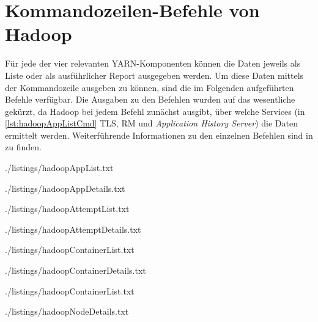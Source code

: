\chapter{Kommandozeilen-Befehle von Hadoop}\label{app:hadoopCmds}

Für jede der vier relevanten YARN-Komponenten können die Daten jeweils als Liste oder als ausführlicher Report ausgegeben werden. Um diese Daten mittels der Kommandozeile ausgeben zu können, sind die im Folgenden aufgeführten Befehle verfügbar. Die Ausgaben zu den Befehlen wurden auf das wesentliche gekürzt, \uA da Hadoop bei jedem Befehl zunächst ausgibt, über welche Services (in \autoref{lst:hadoopAppListCmd} \ac{TLS}, \ac{RM} und \emph{Application History Server}) die Daten ermittelt werden. Weiterführende Informationen zu den einzelnen Befehlen sind in \cite{HadoopYarnCmds271} zu finden.


{./listings/hadoopAppList.txt}


{./listings/hadoopAppDetails.txt}


{./listings/hadoopAttemptList.txt}


{./listings/hadoopAttemptDetails.txt}


{./listings/hadoopContainerList.txt}


{./listings/hadoopContainerDetails.txt}


{./listings/hadoopContainerList.txt}


{./listings/hadoopNodeDetails.txt}